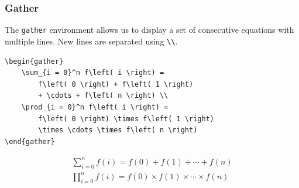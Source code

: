\documentclass[11pt, twoside]{article}
\begin{document}
\subsubsection{Gather}
The \lstinline{gather} environment allows us to display a set of consecutive equations with multiple lines.
New lines are separated using \lstinline|\\|.
\begin{lstlisting}
\begin{gather}
    \sum_{i = 0}^n f\left( i \right) = 
        f\left( 0 \right) + f\left( 1 \right) 
        + \cdots + f\left( n \right) \\
    \prod_{i = 0}^n f\left( i \right) = 
        f\left( 0 \right) \times f\left( 1 \right) 
        \times \cdots \times f\left( n \right)
\end{gather}
\end{lstlisting}
\begin{gather}
    \sum_{i = 0}^n f\left( i \right) = f\left( 0 \right) + f\left( 1 \right) + \cdots + f\left( n \right) \\
    \prod_{i = 0}^n f\left( i \right) = f\left( 0 \right) \times f\left( 1 \right) \times \cdots \times f\left( n \right)
\end{gather}
\newpage
\end{document}
